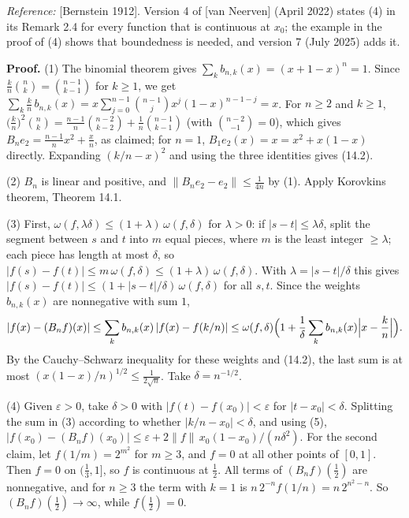 \documentclass[
  english,
  11pt,
  a4paper,
]{article}
\begin{document}
\emph{Reference:} {[}Bernstein 1912{]}. Version 4 of {[}van Neerven{]}
(April 2022) states (4) in its Remark 2.4 for every function that is
continuous at \(x_0\); the example in the proof of (4) shows that
boundedness is needed, and version 7 (July 2025) adds it.

\textbf{Proof.} (1) The binomial theorem gives
\(\sum_kb_{n,k}(x)=(x+1-x)^n=1\). Since
\(\frac kn\binom nk=\binom{n-1}{k-1}\) for \(k\geq1\), we get
\(\sum_k\frac kn\,b_{n,k}(x)=x\sum_{j=0}^{n-1}\binom{n-1}jx^j(1-x)^{n-1-j}=x\).
For \(n\geq2\) and \(k\geq1\),
\(\bigl(\frac kn\bigr)^2\binom nk=\frac{n-1}n\binom{n-2}{k-2}+\frac1n\binom{n-1}{k-1}\)
(with \(\binom{n-2}{-1}=0\)), which gives
\(B_ne_2=\frac{n-1}nx^2+\frac xn\), as claimed; for \(n=1\),
\(B_1e_2(x)=x=x^2+x(1-x)\) directly. Expanding \((k/n-x)^2\) and using
the three identities gives (14.2).

(2) \(B_n\) is linear and positive, and \(\|B_ne_2-e_2\|\leq\frac1{4n}\)
by (1). Apply Korovkin\textquotesingle s theorem, Theorem 14.1.

(3) First, \(\omega(f,\lambda\delta)\leq(1+\lambda)\,\omega(f,\delta)\)
for \(\lambda>0\): if \(|s-t|\leq\lambda\delta\), split the segment
between \(s\) and \(t\) into \(m\) equal pieces, where \(m\) is the
least integer \(\geq\lambda\); each piece has length at most \(\delta\),
so
\(|f(s)-f(t)|\leq m\,\omega(f,\delta)\leq(1+\lambda)\,\omega(f,\delta)\).
With \(\lambda=|s-t|/\delta\) this gives
\(|f(s)-f(t)|\leq(1+|s-t|/\delta)\,\omega(f,\delta)\) for all \(s,t\).
Since the weights \(b_{n,k}(x)\) are nonnegative with sum \(1\),
\[|f(x)-(B_nf)(x)|\leq\sum_kb_{n,k}(x)\,|f(x)-f(k/n)|\leq\omega(f,\delta)\Bigl(1+\frac1\delta\sum_kb_{n,k}(x)\Bigl|x-\frac kn\Bigr|\Bigr).\]
By the Cauchy--Schwarz inequality for these weights and (14.2), the last
sum is at most \((x(1-x)/n)^{1/2}\leq\frac1{2\sqrt n}\). Take
\(\delta=n^{-1/2}\).

(4) Given \(\varepsilon>0\), take \(\delta>0\) with
\(|f(t)-f(x_0)|<\varepsilon\) for \(|t-x_0|<\delta\). Splitting the sum
in (3) according to whether \(|k/n-x_0|<\delta\), and using (5),
\(|f(x_0)-(B_nf)(x_0)|\leq\varepsilon+2\|f\|\,x_0(1-x_0)/(n\delta^2)\).
For the second claim, let \(f(1/m)=2^{m^2}\) for \(m\geq3\), and \(f=0\)
at all other points of \([0,1]\). Then \(f=0\) on \((\frac13,1]\), so
\(f\) is continuous at \(\frac12\). All terms of \((B_nf)(\frac12)\) are
nonnegative, and for \(n\geq3\) the term with \(k=1\) is
\(n\,2^{-n}f(1/n)=n\,2^{n^2-n}\). So \((B_nf)(\frac12)\to\infty\), while
\(f(\frac12)=0\).
\end{document}
